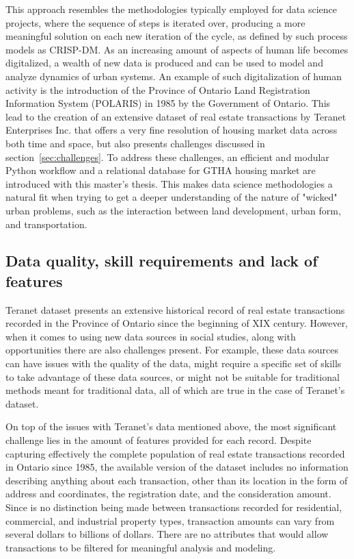 This approach resembles the methodologies typically employed for data science projects, where the sequence of steps is iterated over, producing a more meaningful solution on each new iteration of the cycle, as defined by such process models as CRISP-DM\cite{Shearer2000}.
As an increasing amount of aspects of human life becomes digitalized, a wealth of new data is produced and can be used to model and analyze dynamics of urban systems\cite{Arribas-Bel2014, Chen2016}.
An example of such digitalization of human activity is the introduction of the Province of Ontario Land Registration Information System (POLARIS) in 1985 by the Government of Ontario\cite{TeranetEnterprisesInc.}.
This lead to the creation of an extensive dataset of real estate transactions by Teranet Enterprises Inc.
that offers a very fine resolution of housing market data across both time and space, but also presents challenges discussed in section~\ref{sec:challenges}.
To address these challenges, an efficient and modular Python workflow and a relational database for GTHA housing market are introduced with this master's thesis.
This makes data science methodologies a natural fit when trying to get a deeper understanding of the nature of "wicked" urban problems, such as the interaction between land development, urban form, and transportation.

\subsection{Data quality, skill requirements and lack of features} \label{subsec:challenges_quality_skills_features}

Teranet dataset presents an extensive historical record of real estate transactions recorded in the Province of Ontario since the beginning of XIX century.
However, when it comes to using new data sources in social studies, along with opportunities there are also challenges present.
For example, these data sources can have issues with the quality of the data, might require a specific set of skills to take advantage of these data sources, or might not be suitable for traditional methods meant for traditional data\cite{Arribas-Bel2014}, all of which are true in the case of Teranet's dataset.

On top of the issues with Teranet's data mentioned above, the most significant challenge lies in the amount of features provided for each record.
Despite capturing effectively the complete population of real estate transactions recorded in Ontario since 1985, the available version of the dataset includes no information describing anything about each transaction, other than its location in the form of address and coordinates, the registration date, and the consideration amount.
Since is no distinction being made between transactions recorded for residential, commercial, and industrial property types, transaction amounts can vary from several dollars to billions of dollars.
There are no attributes that would allow transactions to be filtered for meaningful analysis and modeling.

